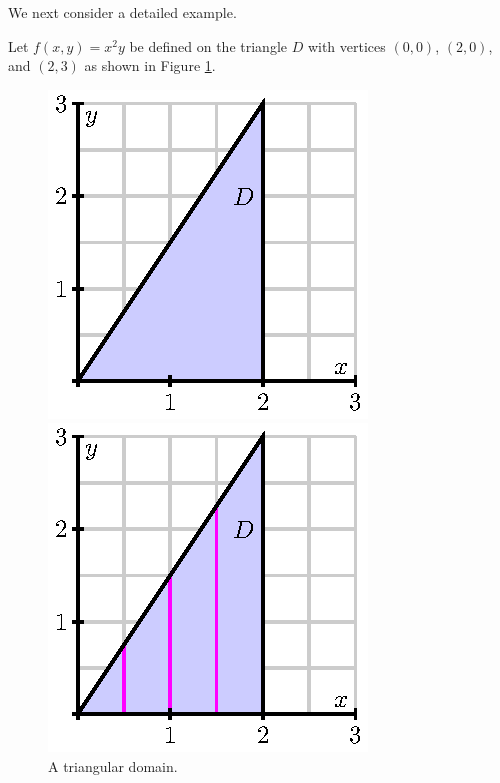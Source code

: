 We next consider a detailed example.

\begin{example} Let $f(x,y) = x^2y$ be defined on the triangle $D$ with vertices $(0,0)$, $(2,0)$, and $(2,3)$ as shown in Figure \ref{F:11.3.DI_1}.
\begin{figure}[h]
\begin{center}
\begin{minipage}{1.75in}
\begin{center}
  \includegraphics{figures/fig_11_3_triangular.eps}
\end{center}
\caption{A triangular domain.}
\label{F:11.3.DI_1}
\end{minipage} \hspace{0.2in}
\begin{minipage}{1.75in}
\begin{center}
  \includegraphics{figures/fig_11_3_triangular_v.eps}

\end{center}
\end{minipage}
\end{center}
\end{figure}
\end{example}
